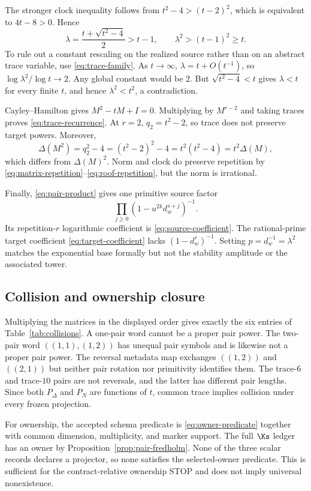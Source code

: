 The stronger clock inequality follows from
$t^2-4>(t-2)^2$, which is equivalent to $4t-8>0$.  Hence
\[
  \lambda=\frac{t+\sqrt{t^2-4}}2>t-1,
  \qquad \lambda^2>(t-1)^2\ge t.
\]
To rule out a constant rescaling on the realized source rather than on an
abstract trace variable, use \eqref{eq:trace-family}.  As $t\to\infty$,
$\lambda=t+O(t^{-1})$, so
$\log\lambda^2/\log t\to2$.  Any global constant would be $2$.  But
$\sqrt{t^2-4}<t$ gives $\lambda<t$ for every finite $t$, and hence
$\lambda^2<t^2$, a contradiction.

Cayley--Hamilton gives $M^2-tM+I=0$.  Multiplying by $M^{r-2}$ and taking
traces proves \eqref{eq:trace-recurrence}.  At $r=2$,
$q_2=t^2-2$, so trace does not preserve target powers.  Moreover,
\[
  \Delta(M^2)=q_2^2-4=(t^2-2)^2-4=t^2(t^2-4)=t^2\Delta(M),
\]
which differs from $\Delta(M)^2$.  Norm and clock do preserve repetition by
\eqref{eq:matrix-repetition}--\eqref{eq:roof-repetition}, but the norm is
irrational.

Finally, \eqref{eq:pair-product} gives one primitive source factor
\[
  \prod_{j\ge0}(1-u^{2k}d_w^{s+j})^{-1}.
\]
Its repetition-$r$ logarithmic coefficient is
\eqref{eq:source-coefficient}.  The rational-prime target coefficient
\eqref{eq:target-coefficient} lacks $(1-d_w^r)^{-1}$.  Setting
$p=d_w^{-1}=\lambda^2$ matches the exponential base formally but not the
stability amplitude or the associated tower.

\subsection{Collision and ownership closure}
\label{app:collision-proof}

Multiplying the matrices in the displayed order gives exactly the six entries
of Table~\ref{tab:collisions}.  A one-pair word cannot be a proper pair power.
The two-pair word $((1,1),(1,2))$ has unequal pair symbols and is likewise not
a proper pair power.  The reversal metadata map exchanges $((1,2))$ and
$((2,1))$ but neither pair rotation nor primitivity identifies them.  The
trace-$6$ and trace-$10$ pairs are not reversals, and the latter has different
pair lengths.  Since both $P_\Delta$ and $P_N$ are functions of $t$, common
trace implies collision under every frozen projection.

For ownership, the accepted schema predicate is
\eqref{eq:owner-predicate} together with common dimension, multiplicity, and
marker support.  The full $\Ks$ ledger has an owner by
Proposition~\ref{prop:pair-fredholm}.  None of the three scalar records
declares a projector, so none satisfies the selected-owner predicate.  This
is sufficient for the contract-relative ownership STOP and does not imply
universal nonexistence.
